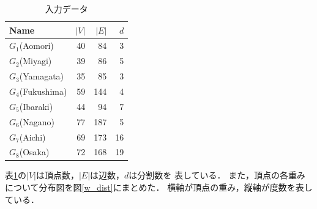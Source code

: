 \begin{table}[htbp]
  \caption{入力データ}
  \label{input_data}
  \centering
  \begin{tabular}{l|rrr}
    \hline
    Name & $|V|$ & $|E|$ & $d$ \\
    \hline \hline
    $G_1$(Aomori) & 40 & 84 & 3 \\
    $G_2$(Miyagi) & 39 & 86 & 5 \\
    $G_3$(Yamagata) & 35 & 85 & 3 \\
    $G_4$(Fukushima) & 59 & 144 & 4 \\
    $G_5$(Ibaraki) & 44 & 94 & 7 \\
    $G_6$(Nagano) & 77 & 187 & 5 \\
    $G_7$(Aichi) & 69 & 173 & 16 \\
    $G_8$(Osaka) & 72 & 168 & 19 \\
    \hline
  \end{tabular}
\end{table}

表\ref{input_data}の$|V|$は頂点数，$|E|$は辺数，$d$は分割数を
表している．
また，頂点の各重みについて分布図を図\ref{w_dist}にまとめた．
横軸が頂点の重み，縦軸が度数を表している．

